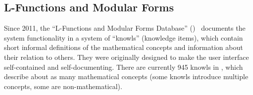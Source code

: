 %
%
%
%
%

\subsection{L-Functions and Modular Forms}\label{sec:onto:knowls}

Since 2011, the ``L-Functions and Modular Forms Database'' (\LMFDB)~\cite{Cremona:LMFDB16,lmfdb:on} documents the system functionality in a system of ``knowls'' (knowledge items), which contain short informal definitions of the mathematical concepts and information about their relation to others.
They were originally designed to make the \LMFDB user interface self-contained and self-documenting.
There are currently 945 knowls in \LMFDB, which describe about as many mathematical concepts (some knowls introduce multiple concepts, some are non-mathematical). 

